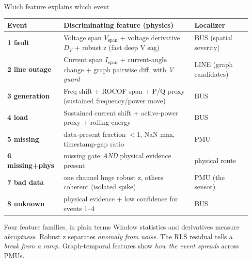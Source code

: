 \documentclass[aspectratio=169,10pt,t]{beamer}
\begin{document}
\begin{frame}{Which feature explains which event}
\scriptsize
\centering
\renewcommand{\arraystretch}{0.88}
\begin{tabular}{p{}p{}p{}}
\toprule
\textbf{Event} & \textbf{Discriminating feature (physics)} & \textbf{Localizer}\\
\midrule
\textbf{1 fault} & Voltage span $V_{\mathrm{span}}$ + voltage derivative $D_V$ + robust z (fast deep V sag) & BUS (spatial severity)\\
\textbf{2 line outage} & Current span $I_{\mathrm{span}}$ + current-angle change + graph pairwise diff, with \emph{V guard} & LINE (graph candidates)\\
\textbf{3 generation} & Freq shift + ROCOF span + P/Q proxy (sustained frequency/power move) & BUS\\
\textbf{4 load} & Sustained current shift + active-power proxy + rolling energy & BUS\\
\textbf{5 missing} & data-present fraction $<$1, NaN max, timestamp-gap ratio & PMU\\
\textbf{6 missing+phys} & missing gate \emph{AND} physical evidence present & physical route\\
\textbf{7 bad data} & one channel huge robust z, others coherent (isolated spike) & PMU (the sensor)\\
\textbf{8 unknown} & physical evidence + low confidence for events 1--4 & BUS\\
\bottomrule
\end{tabular}
\vspace{-0.5mm}
\begin{block}{Four feature families, in plain terms}
\scriptsize
Window statistics and derivatives measure \emph{abruptness}. Robust z separates \emph{anomaly from noise}. The RLS residual tells a \emph{break from a ramp}. Graph-temporal features show \emph{how the event spreads} across PMUs.
\end{block}
\end{frame}

\end{document}
